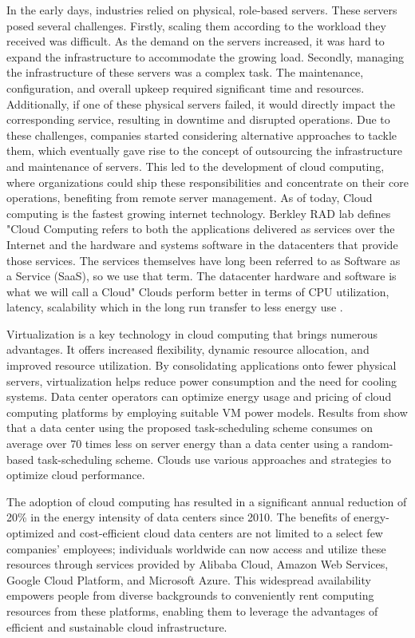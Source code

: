 \documentclass[
  a4paper,  %
  twoside,  %
  bibliography=totoc,
  headsepline,
  cleardoublepage=empty,
  parskip=half,
  draft=false
]{scrbook}
\begin{document}
In the early days, industries relied on physical, role-based servers. These servers posed several challenges. Firstly, scaling them according to the workload they received was difficult. As the demand on the servers increased, it was hard to expand the infrastructure to accommodate the growing load. Secondly, managing the infrastructure of these servers was a complex task. The maintenance, configuration, and overall upkeep required significant time and resources. Additionally, if one of these physical servers failed, it would directly impact the corresponding service, resulting in downtime and disrupted operations. Due to these challenges, companies started considering alternative approaches to tackle them, which eventually gave rise to the concept of outsourcing the infrastructure and maintenance of servers. This led to the development of cloud computing, where organizations could ship these responsibilities and concentrate on their core operations, benefiting from remote server management. As of today, Cloud computing is the fastest growing internet technology\cite{anand2021need}. Berkley RAD lab defines "Cloud Computing refers to both the applications delivered as services over the Internet and the hardware and systems software in the datacenters that provide those services. The services themselves have long been referred to as Software as a Service (SaaS), so we use that term. The datacenter hardware and software is what we will call a Cloud"\cite{fox2009above}
Clouds perform better in terms of CPU utilization, latency, scalability which in the long run transfer to less energy use \cite{khanghahi2013cloud}. 

Virtualization is a key technology in cloud computing that brings numerous advantages. It offers increased flexibility, dynamic resource allocation, and improved resource utilization. By consolidating applications onto fewer physical servers, virtualization helps reduce power consumption and the need for cooling systems. Data center operators can optimize energy usage and pricing of cloud computing platforms by employing suitable VM power models. Results from \cite{6679892} show that a data center using the proposed task-scheduling scheme consumes on average over 70 times less on server energy than a data center using a random-based task-scheduling scheme. Clouds use various approaches and strategies to optimize cloud performance\cite{alzakholi2020comparison}.

The adoption of cloud computing has resulted in a significant annual reduction of 20\% in the energy intensity of data centers since 2010. The benefits of energy-optimized and cost-efficient cloud data centers are not limited to a select few companies' employees; individuals worldwide can now access and utilize these resources through services provided by Alibaba Cloud, Amazon Web Services, Google Cloud Platform, and Microsoft Azure. This widespread availability empowers people from diverse backgrounds to conveniently rent computing resources from these platforms, enabling them to leverage the advantages of efficient and sustainable cloud infrastructure\cite{patterson2021carbon}.
\end{document}
